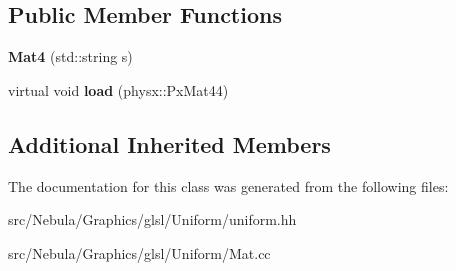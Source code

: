 \subsection*{Public Member Functions}
\begin{DoxyCompactItemize}
\item 
\hypertarget{classNeb_1_1glsl_1_1Uniform_1_1Scalar_1_1Mat4_ac57a935305d8c22176790fde979b5414}{{\bfseries Mat4} (std\-::string s)}\label{classNeb_1_1glsl_1_1Uniform_1_1Scalar_1_1Mat4_ac57a935305d8c22176790fde979b5414}

\item 
\hypertarget{classNeb_1_1glsl_1_1Uniform_1_1Scalar_1_1Mat4_ad58f9ce013be0a4a863fafd167a325e0}{virtual void {\bfseries load} (physx\-::\-Px\-Mat44)}\label{classNeb_1_1glsl_1_1Uniform_1_1Scalar_1_1Mat4_ad58f9ce013be0a4a863fafd167a325e0}

\end{DoxyCompactItemize}
\subsection*{Additional Inherited Members}


The documentation for this class was generated from the following files\-:\begin{DoxyCompactItemize}
\item 
src/\-Nebula/\-Graphics/glsl/\-Uniform/uniform.\-hh\item 
src/\-Nebula/\-Graphics/glsl/\-Uniform/Mat.\-cc\end{DoxyCompactItemize}
